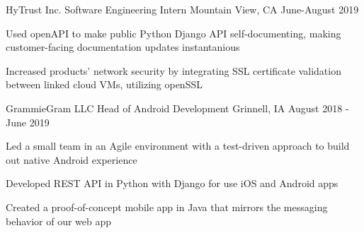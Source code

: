 \documentclass[11pt, a4paper]{awesome-cv}
\begin{document}
\begin{cventries}

  \cventry
    {HyTrust Inc.}
    {Software Engineering Intern}
    {Mountain View, CA}
    {June-August 2019}
    {
      \begin{cvitems}
      	\item {Used openAPI to make public Python Django API self-documenting, making customer-facing documentation updates instantanious}
	      \item {Increased products' network security by integrating SSL certificate validation between linked cloud VMs, utilizing openSSL}
      \end{cvitems}
    }

  \cventry
    {GrammieGram LLC}
    {Head of Android Development}
    {Grinnell, IA}
    {August 2018 - June 2019}
    {
      \begin{cvitems}
        \item {Led a small team in an Agile environment with a test-driven approach to build out native Android experience}
      	\item {Developed REST API in Python with Django for use iOS and Android apps}
	      \item {Created a proof-of-concept mobile app in Java that mirrors the messaging behavior of our web app}
      \end{cvitems}
    }



\end{cventries}
\end{document}
